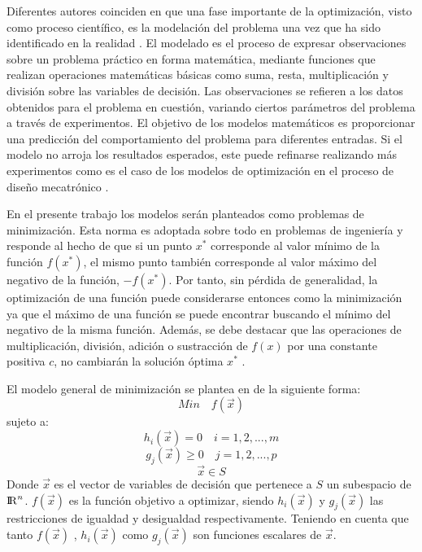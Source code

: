 Diferentes autores coinciden en que una fase importante de la optimización, visto como proceso científico, es la modelación del problema una vez que ha sido identificado en la realidad \cite{rao_engineering_2009} \cite{nocedal2006numerical} \cite{luenberger_linear_2015}. El modelado es el proceso de expresar observaciones sobre un problema práctico en forma matemática, mediante funciones que realizan operaciones matemáticas básicas como suma, resta, multiplicación y división sobre las variables de decisión. Las observaciones se refieren a los datos obtenidos para el problema en cuestión, variando ciertos parámetros del problema a través de experimentos. El objetivo de los modelos matemáticos es proporcionar una predicción del comportamiento del problema para diferentes entradas. Si el modelo no arroja los resultados esperados, este puede refinarse realizando más experimentos como es el caso de los modelos de optimización en el proceso de diseño mecatrónico \cite{arora_optimization:_2015}.  

En el presente trabajo los modelos serán planteados como problemas de minimización. Esta norma es adoptada sobre todo en problemas de ingeniería y responde al hecho de que si un punto $x^*$ corresponde al valor mínimo de la función $f(x^*)$, el mismo punto también corresponde al valor máximo del negativo de la función, $-f(x^*)$. Por tanto, sin pérdida de generalidad, la optimización de una función puede considerarse entonces como la minimización ya que el máximo de una función se puede encontrar buscando el mínimo del negativo de la misma función. Además, se debe destacar que las operaciones de multiplicación, división, adición o sustracción de $f(x)$ por una constante positiva $c$, no cambiarán la solución óptima $x^*$ \cite{rao_engineering_2009}. 

El modelo general de minimización se plantea en \cite{luenberger_linear_2015} de la siguiente forma:
\begin{equation}
Min\quad  f(\vec{x})
\end{equation}
sujeto a:
\begin{equation}
h_{i}(\vec{x})=0 \quad i=1,2,...,m
\end{equation}
\begin{equation}
g_{j}(\vec{x}) \geq 0 \quad j=1,2,...,p 
\end{equation}
\begin{equation}
	\vec{x} \in S
\end{equation}
Donde $\vec{x}$ es el vector de variables de decisión que pertenece a $S$ un subespacio de ${\rm I\!R}^{n}$. $f(\vec{x})$  es la función objetivo a optimizar, siendo $h_{i}(\vec{x})$ y $g_{j}(\vec{x})$ las restricciones de igualdad y desigualdad respectivamente. Teniendo en cuenta que tanto $f(\vec{x})$ , $h_{i}(\vec{x})$ como $g_{j}(\vec{x})$ son funciones escalares de $\vec{x}$. 
